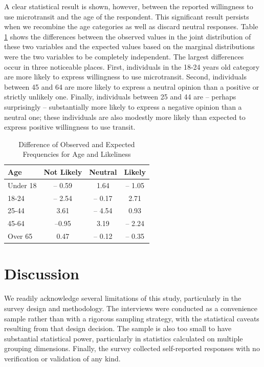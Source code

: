 \documentclass[smartcities,article,submit,moreauthors,pdftex]{Definitions/mdpi}
\begin{document}
A clear statistical result is shown, however, between the reported willingness to use microtransit and the age of the respondent. This significant result persists when we recombine the age categories as well as discard neutral responses. Table \ref{tab:age-difference} shows the differences between the observed values in the joint distribution of these two variables and the expected values based on the marginal distributions were the two variables to be completely independent. The largest differences occur in three noticeable places. First, individuals in the 18-24 years old category are more likely to express willingness to use microtransit. Second, individuals between 45 and 64 are more likely to express a neutral opinion than a positive or strictly unlikely one. Finally, individuals between 25 and 44 are – perhaps surprisingly – substantially more likely to express a negative opinion than a neutral one; these individuals are also modestly more likely than expected to express positive willingness to use transit. 

\begin{table}[ht]
    \centering
         \renewcommand{\arraystretch}{1.5}
    \caption{Difference of Observed and Expected Frequencies for Age and Likeliness}
    \label{tab:age-difference}
    \begin{tabular}{@{}lccc@{}}
\toprule
Age      & Not Likely & Neutral & Likely \\
\midrule
Under 18 & – 0.59     & 1.64    & – 1.05 \\
18-24    & – 2.54     & – 0.17  & 2.71   \\
25-44    & 3.61       & – 4.54  & 0.93   \\
45-64    & –0.95      & 3.19    & – 2.24 \\
Over 65  & 0.47       & – 0.12  & – 0.35\\
\bottomrule
\end{tabular}
\end{table}

\section{Discussion}
We readily acknowledge several limitations of this study, particularly in the survey design and methodology. The interviews were conducted as a convenience sample rather than with a rigorous sampling strategy, with the statistical caveats resulting from that design decision. The sample is also too small to have substantial statistical power, particularly in statistics calculated on multiple grouping dimensions. Finally, the survey collected self-reported responses with no verification or validation of any kind.
\end{document}
